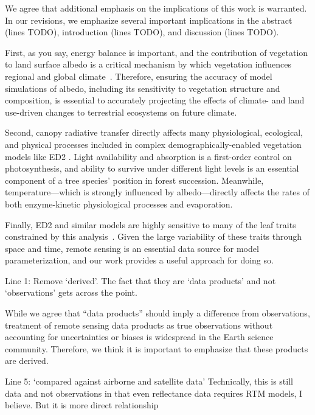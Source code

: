 We agree that additional emphasis on the implications of this work is warranted.
In our revisions, we emphasize several important implications in the abstract (lines TODO), introduction (lines TODO), and discussion (lines TODO).

First, as you say, energy balance is important, and the contribution of vegetation to land surface albedo is a critical mechanism by which vegetation influences regional and global climate~\citep{bonan2008forests}. Therefore, ensuring the accuracy of model simulations of albedo, including its sensitivity to vegetation structure and composition, is essential to accurately projecting the effects of climate- and land use-driven changes to terrestrial ecosystems on future climate.

Second, canopy radiative transfer directly affects many physiological, ecological, and physical processes included in complex demographically-enabled vegetation models like ED2 \citep{viskari_2019_influence}.
Light availability and absorption is a first-order control on photosynthesis, and ability to survive under different light levels is an essential component of a tree species’ position in forest succession.
Meanwhile, temperature---which is strongly influenced by albedo---directly affects the rates of both enzyme-kinetic physiological processes and evaporation.

Finally, ED2 and similar models are highly sensitive to many of the leaf traits constrained by this analysis~\citep{raczka_2018_what, dietze2014quantitative, shiklomanov2020structurea}.
Given the large variability of these traits through space and time, remote sensing is an essential data source for model parameterization, and our work provides a useful approach for doing so.

\begin{reviewer}
  Line 1: Remove ‘derived’. The fact that they are ‘data products’ and not ‘observations’ gets across the point.
\end{reviewer}

While we agree that ``data products'' should imply a difference from observations, treatment of remote sensing data products as true observations without accounting for uncertainties or biases is widespread in the Earth science community.
Therefore, we think it is important to emphasize that these products are derived.

\begin{reviewer}
  Line 5: ‘compared against airborne and satellite data’ Technically, this is still data and not observations in that even reflectance data requires RTM models, I believe. But it is more direct relationship
\end{reviewer}

